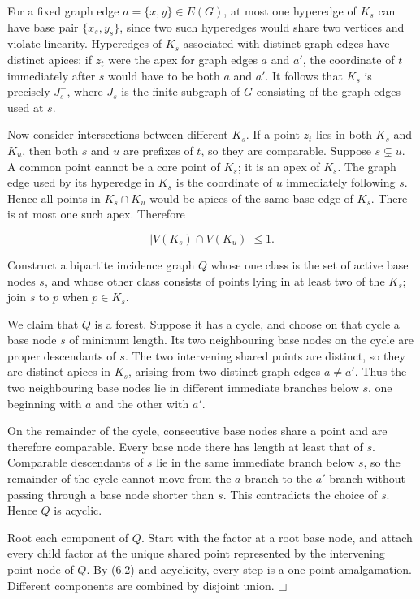 \documentclass[11pt]{article}
\providecommand{\square}{\mdlgwhtsquare}
\begin{document}
For a fixed graph edge \(a=\{x,y\}\in E(G)\), at most one hyperedge of \(K_s\) can have base pair \(\{x_s,y_s\}\), since two such hyperedges would share two vertices and violate linearity. Hyperedges of \(K_s\) associated with distinct graph edges have distinct apices: if \(z_t\) were the apex for graph edges \(a\) and \(a'\), the coordinate of \(t\) immediately after \(s\) would have to be both \(a\) and \(a'\). It follows that \(K_s\) is precisely \(J_s^+\), where \(J_s\) is the finite subgraph of \(G\) consisting of the graph edges used at \(s\).

Now consider intersections between different \(K_s\). If a point \(z_t\) lies in both \(K_s\) and \(K_u\), then both \(s\) and \(u\) are prefixes of \(t\), so they are comparable. Suppose \(s\subsetneq u\). A common point cannot be a core point of \(K_s\); it is an apex of \(K_s\). The graph edge used by its hyperedge in \(K_s\) is the coordinate of \(u\) immediately following \(s\). Hence all points in \(K_s\cap K_u\) would be apices of the same base edge of \(K_s\). There is at most one such apex. Therefore

\[
|V(K_s)\cap V(K_u)|\le1. \tag{6.2}
\]

Construct a bipartite incidence graph \(Q\) whose one class is the set of active base nodes \(s\), and whose other class consists of points lying in at least two of the \(K_s\); join \(s\) to \(p\) when \(p\in K_s\).

We claim that \(Q\) is a forest. Suppose it has a cycle, and choose on that cycle a base node \(s\) of minimum length. Its two neighbouring base nodes on the cycle are proper descendants of \(s\). The two intervening shared points are distinct, so they are distinct apices in \(K_s\), arising from two distinct graph edges \(a\ne a'\). Thus the two neighbouring base nodes lie in different immediate branches below \(s\), one beginning with \(a\) and the other with \(a'\).

On the remainder of the cycle, consecutive base nodes share a point and are therefore comparable. Every base node there has length at least that of \(s\). Comparable descendants of \(s\) lie in the same immediate branch below \(s\), so the remainder of the cycle cannot move from the \(a\)-branch to the \(a'\)-branch without passing through a base node shorter than \(s\). This contradicts the choice of \(s\). Hence \(Q\) is acyclic.

Root each component of \(Q\). Start with the factor at a root base node, and attach every child factor at the unique shared point represented by the intervening point-node of \(Q\). By (6.2) and acyclicity, every step is a one-point amalgamation. Different components are combined by disjoint union. \(\square\)
\end{document}
